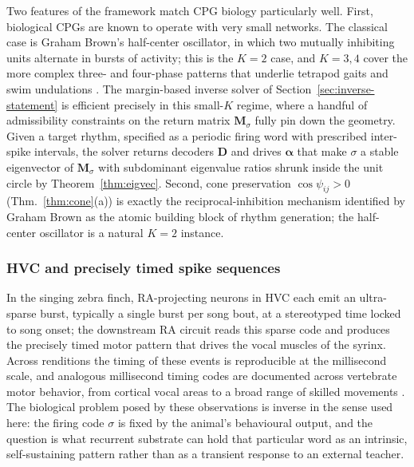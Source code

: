 \documentclass[12pt]{article}
\newcommand{\vv}[1]{\mathbf{#1}}
\begin{document}
Two features of the framework match CPG biology particularly well. First, biological CPGs are known to operate with very small networks. The classical case is Graham Brown's half-center oscillator, in which two mutually inhibiting units alternate in bursts of activity; this is the $K=2$ case, and $K=3,4$ cover the more complex three- and four-phase patterns that underlie tetrapod gaits and swim undulations \citep{grillner2006biological,kiehn2016decoding}. The margin-based inverse solver of Section~\ref{sec:inverse-statement} is efficient precisely in this small-$K$ regime, where a handful of admissibility constraints on the return matrix $\vv{M}_\sigma$ fully pin down the geometry. Given a target rhythm, specified as a periodic firing word with prescribed inter-spike intervals, the solver returns decoders $\vv{D}$ and drives $\boldsymbol{\alpha}$ that make $\sigma$ a stable eigenvector of $\vv{M}_\sigma$ with subdominant eigenvalue ratios shrunk inside the unit circle by Theorem~\ref{thm:eigvec}. Second, cone preservation $\cos\psi_{ij}>0$ (Thm.~\ref{thm:cone}(a)) is exactly the reciprocal-inhibition mechanism identified by Graham Brown as the atomic building block of rhythm generation; the half-center oscillator is a natural $K=2$ instance.

\subsubsection{HVC and precisely timed spike sequences}\label{sec:apps-hvc}

In the singing zebra finch, RA-projecting neurons in HVC each emit an ultra-sparse burst, typically a single burst per song bout, at a stereotyped time locked to song onset; the downstream RA circuit reads this sparse code and produces the precisely timed motor pattern that drives the vocal muscles of the syrinx. Across renditions the timing of these events is reproducible at the millisecond scale, and analogous millisecond timing codes are documented across vertebrate motor behavior, from cortical vocal areas \citep{tang2014millisecond} to a broad range of skilled movements \citep{sober2018millisecond,pascual2024millisecond}. The biological problem posed by these observations is inverse in the sense used here: the firing code $\sigma$ is fixed by the animal's behavioural output, and the question is what recurrent substrate can hold that particular word as an intrinsic, self-sustaining pattern rather than as a transient response to an external teacher.
\end{document}
